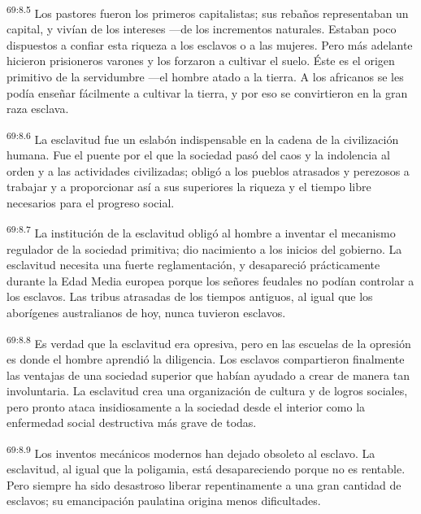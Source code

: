 \par
\textsuperscript{69:8.5} Los pastores fueron los primeros capitalistas; sus rebaños representaban un capital, y vivían de los intereses ---de los incrementos naturales. Estaban poco dispuestos a confiar esta riqueza a los esclavos o a las mujeres. Pero más adelante hicieron prisioneros varones y los forzaron a cultivar el suelo. Éste es el origen primitivo de la servidumbre ---el hombre atado a la tierra. A los africanos se les podía enseñar fácilmente a cultivar la tierra, y por eso se convirtieron en la gran raza esclava.

\par
\textsuperscript{69:8.6} La esclavitud fue un eslabón indispensable en la cadena de la civilización humana. Fue el puente por el que la sociedad pasó del caos y la indolencia al orden y a las actividades civilizadas; obligó a los pueblos atrasados y perezosos a trabajar y a proporcionar así a sus superiores la riqueza y el tiempo libre necesarios para el progreso social.

\par
\textsuperscript{69:8.7} La institución de la esclavitud obligó al hombre a inventar el mecanismo regulador de la sociedad primitiva; dio nacimiento a los inicios del gobierno. La esclavitud necesita una fuerte reglamentación, y desapareció prácticamente durante la Edad Media europea porque los señores feudales no podían controlar a los esclavos. Las tribus atrasadas de los tiempos antiguos, al igual que los aborígenes australianos de hoy, nunca tuvieron esclavos.

\par
\textsuperscript{69:8.8} Es verdad que la esclavitud era opresiva, pero en las escuelas de la opresión es donde el hombre aprendió la diligencia. Los esclavos compartieron finalmente las ventajas de una sociedad superior que habían ayudado a crear de manera tan involuntaria. La esclavitud crea una organización de cultura y de logros sociales, pero pronto ataca insidiosamente a la sociedad desde el interior como la enfermedad social destructiva más grave de todas.

\par
\textsuperscript{69:8.9} Los inventos mecánicos modernos han dejado obsoleto al esclavo. La esclavitud, al igual que la poligamia, está desapareciendo porque no es rentable. Pero siempre ha sido desastroso liberar repentinamente a una gran cantidad de esclavos; su emancipación paulatina origina menos dificultades.

